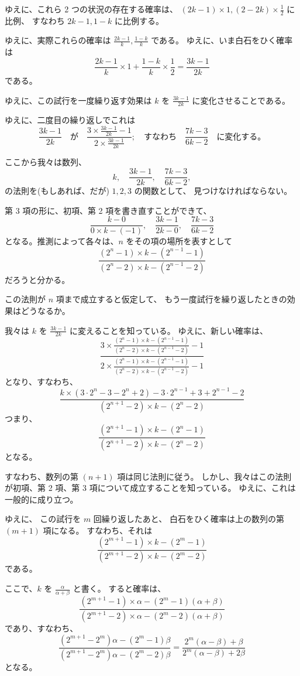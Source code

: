 ゆえに、これら 2 つの状況の存在する確率は、
$(2k - 1)\times 1, (2-2k) \times \frac{1}{2}$ に比例、
すなわち $2k - 1, 1 - k$ に比例する。

ゆえに、実際これらの確率は $\frac{2k-1}{k}, \frac{1-k}{k}$
である。
ゆえに、いま白石をひく確率は
\[
\frac{2k-1}{k} \times 1 + \frac{1-k}{k} \times \frac{1}{2}
= \frac{3k-1}{2k}
\]
である。

ゆえに、この試行を一度繰り返す効果は $k$ を $\frac{3k-1}{2k}$
に変化させることである。

ゆえに、二度目の繰り返しでこれは
\[
\frac{3k-1}{2k}
\quad \mbox{が}
\quad \frac{3 \times \frac{3k-1}{2k} - 1}{2 \times \frac{3k-1}{2k}};
\quad \mbox{すなわち}
\quad \frac{7k-3}{6k-2}
\quad \mbox{に変化する。}
\]

ここから我々は数列、
\[
k, \quad
\frac{3k-1}{2k}, \quad
\frac{7k-3}{6k-2},
\]
の法則を(もしあれば、だが) $1, 2, 3$ の関数として、
見つけなければならない。

第 3 項の形に、初項、第 2 項を書き直すことができて、
\[
\frac{k - 0}{0 \times k - (-1)},
\quad \frac{3k -1}{2k - 0},
\quad \frac{7k-3}{6k-2}
\]
となる。推測によって各々は、$n$ をその項の場所を表すとして
\[
\frac{(2^n - 1) \times k - (2^{n-1} - 1)}{(2^n - 2) \times k - (2^{n-1} - 2)}
\]
だろうと分かる。

この法則が $n$ 項まで成立すると仮定して、
もう一度試行を繰り返したときの効果はどうなるか。

我々は $k$ を $\frac{3k-1}{2k}$ に変えることを知っている。
ゆえに、新しい確率は、
\[
\frac{3 \times
\frac{(2^n-1)\times k - (2^{n-1} - 1)}{(2^n-2)\times k - (2^{n-1} - 2)}
-1}
{2 \times
\frac{(2^n-1)\times k - (2^{n-1} - 1)}{(2^n-2)\times k - (2^{n-1} - 2)}
-1}
\]
となり、すなわち、
\[
\frac{k \times (3 \cdot 2^n - 3 - 2^n + 2) - 3 \cdot 2^{n-1} + 3 + 2^{n-1} -2}
{(2^{n+1} - 2) \times k - (2^{n} - 2)}
\]
つまり、
\[
\frac{(2^{n+1} - 1) \times k - (2^{n} - 1)}
{(2^{n+1} - 2) \times k - (2^{n} - 2)}
\]
となる。

すなわち、数列の第 $(n+1)$ 項は同じ法則に従う。
しかし、我々はこの法則が初項、第 2 項、第 3 項について成立することを知っている。
ゆえに、これは一般的に成り立つ。

ゆえに、
この試行を $m$ 回繰り返したあと、
白石をひく確率は上の数列の第 $(m + 1)$ 項になる。
すなわち、それは
\[
\frac{(2^{m+1} - 1) \times k - (2^{m} - 1)}
{(2^{m+1} - 2) \times k - (2^{m} - 2)}
\]
である。

ここで、$k$ を $\frac{\alpha}{\alpha + \beta}$ と書く。
すると確率は、
\[
\frac{(2^{m+1} - 1) \times \alpha - (2^{m} - 1)(\alpha + \beta)}
{(2^{m+1} - 2) \times \alpha - (2^{m} - 2)(\alpha + \beta)}
\]
であり、すなわち、
\[
\frac{(2^{m+1} - 2^m) \alpha - (2^{m} - 1) \beta}
{(2^{m+1} - 2^m) \alpha - (2^{m} - 2) \beta}
=
\frac{2^m (\alpha - \beta) + \beta}{2^m (\alpha - \beta) + 2 \beta}
\]
となる。

